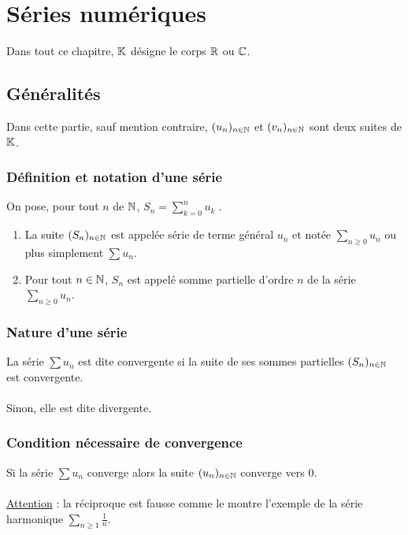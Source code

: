 \chapter{Séries numériques}

\minitoc

Dans tout ce chapitre, \(\mathbb{K}\) désigne le corps \(\mathbb{R}\) ou \(\mathbb{C}\).
\section{Généralités}
Dans cette partie, sauf mention contraire, \((u_n)_{n\in \mathbb{N}}\) et \((v_n)_{n\in \mathbb{N}}\) sont deux suites de \(\mathbb{K}\).
\subsection{Définition et notation d’une série}
\begin{defi}
    On pose, pour tout \(n\) de \(\mathbb{N}\), \(S_n =\sum^n_{k=0}u_k\) .
    \begin{enumerate}
        \item La suite \((S_n)_{n\in \mathbb{N}}\) est appelée série de terme général \(u_n\) et notée \(\sum_{n\geq 0}u_n\) ou plus simplement \(\sum u_n \).
        \item Pour tout \(n \in  \mathbb{N}\), \(S_n\) est appelé somme partielle d’ordre \(n\) de la série \(\sum_{n\geq 0}u_n\).
    \end{enumerate}
\end{defi}
\subsection{Nature d’une série}
\begin{defi}
    La série \(\sum u_n \) est dite convergente si la suite de ses sommes partielles \((S_n)_{n\in \mathbb{N}}\) est convergente.\\~\\
    Sinon, elle est dite divergente.
\end{defi}
\subsection{Condition nécessaire de convergence}
\begin{defprop}
    Si la série \(\sum u_n \) converge alors la suite \((u_n)_{n\in \mathbb{N} }\) converge vers \(0\).\\~\\
    \underline{Attention} : la réciproque est fausse comme le montre l’exemple de la série harmonique \(\sum_{n\geq 1} \frac{1}{n}\).
\end{defprop}

